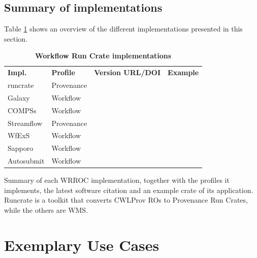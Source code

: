 \documentclass[10pt,letterpaper]{article}
\newlength\savedwidth
\newcommand\thickhline{\noalign{\global\savedwidth\arrayrulewidth\global\arrayrulewidth 2pt}%
\hline
\noalign{\global\arrayrulewidth\savedwidth}}
\begin{document}
\subsection{Summary of implementations}

Table \ref{implementation_summary_table} shows an overview of the different implementations presented in this section.


\begin{table}[!ht]
  \begin{adjustwidth}{-1.4cm}{0in} %
  \centering
  \caption{
  {\bf Workflow Run Crate implementations}}
  \begin{tabular}{l|l|l|l}
  \hline
  {\bf Impl.} & {\bf Profile} & {\bf Version URL/DOI} &
  {\bf Example}\\
  \thickhline
  runcrate & Provenance & \footnotesize \cite{runcrate}  & \footnotesize \cite{run-pathology} \\
  Galaxy & Workflow & \footnotesize \cite{Afgan 2023} & \footnotesize \cite{De Geest 2023} \\
  COMPSs & Workflow & \footnotesize \cite{Ejarque 2023} & \footnotesize \cite{Poiata 2023} \\
  Streamflow & Provenance & \footnotesize \cite{Colonnelli 2023b} & \footnotesize \cite{Colonnelli 2023} \\
  WfExS & Workflow & \footnotesize \cite{Fernández 2023a} & \footnotesize \cite{Fernández 2023b} \\
  Sapporo & Workflow & \footnotesize \cite{Suetake 2023b} & \footnotesize \cite{Ohta 2023} \\
  Autosubmit & Workflow & \footnotesize \cite{Beltrán 2023} & \footnotesize \cite{Kinoshita 2023} \\
  \end{tabular}
  \begin{flushleft} 
    Summary of each WRROC implementation, together with the profiles it implements, the latest software citation and an example crate of its application. Runcrate is a toolkit that converts CWLProv ROs to Provenance Run Crates, while the others are WMS.
  \end{flushleft}
  \label{implementation_summary_table}
  \end{adjustwidth}
\end{table}
  


\section{Exemplary Use Cases}\label{exemplary-use-cases}
\end{document}
